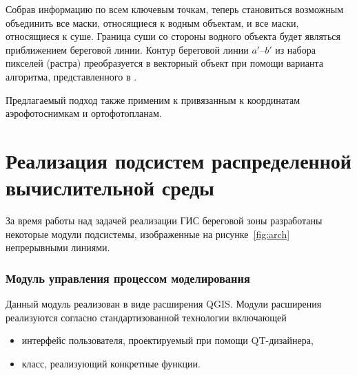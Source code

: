 \documentclass[732,14pt,final]{studrep}
\begin{document}
Собрав информацию по всем ключевым точкам, теперь становиться возможным объединить все маски, относящиеся к водным объектам, и все маски, относящиеся к суше. Граница суши со стороны водного объекта будет являться приближением береговой линии. Контур береговой линии $a'$--$b'$ из набора пикселей (растра) преобразуется в векторный объект при помощи варианта алгоритма, представленного в \cite{b3}.

Предлагаемый подход также применим к привязанным к координатам аэрофотоснимкам и ортофотопланам.

\chapter{Реализация подсистем распределенной вычислительной среды}\label{chap:impl}

За время работы над задачей реализации ГИС береговой зоны разработаны некоторые модули подсистемы, изображенные на рисунке~\ref{fig:arch} непрерывными линиями.

\subsection{Модуль управления процессом моделирования}

Данный модуль реализован в виде расширения QGIS. Модули расширения реализуются согласно стандартизованной технологии включающей
\begin{itemize}
\item интерфейс пользователя, проектируемый при помощи QT-дизайнера,
\item класс, реализующий конкретные функции.
\end{itemize}
\end{document}

